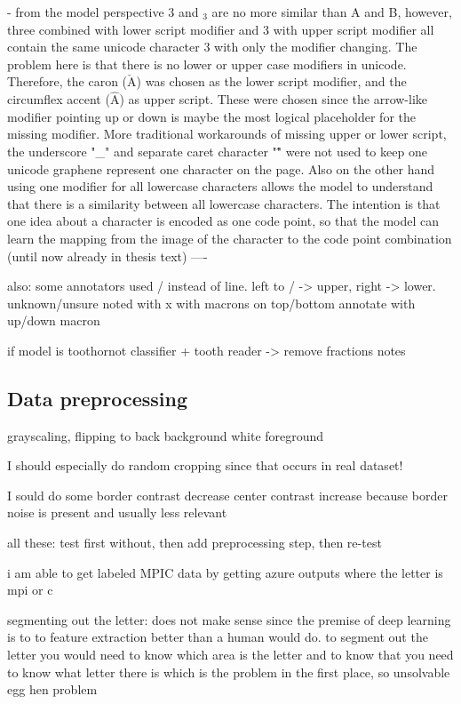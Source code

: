 \documentclass{article}
\begin{document}
- from the model perspective 3 and $_3$ are no more similar than A and B, however, 
three combined with lower script modifier and 3 with upper script modifier 
all contain the same unicode character 3 with only the modifier changing. The 
problem here is that there is no lower or upper case modifiers in unicode. Therefore,
the caron ($\check{\mathrm{A}}$) was chosen as the lower script modifier, and the circumflex accent ($\hat{\mathrm{A}}$)
as upper script. These were chosen since the arrow-like modifier pointing up or down
is maybe the most logical placeholder for the missing modifier. More traditional 
workarounds of missing upper or lower script, the underscore "\_" and separate 
caret character "\^ " were not used to keep one unicode graphene represent one character 
on the page. Also on the other hand using one modifier for all lowercase characters allows 
the model to understand that there is a similarity between all lowercase characters.
The intention is that one idea about a character is encoded as one code point, so that 
the model can learn the mapping from the image of the character to the code point 
combination
(until now already in thesis text)
----

also: some annotators used / instead of line. left to / -> upper, right -> lower.
unknown/unsure noted with x with macrons on top/bottom
annotate with up/down macron

if model is toothornot classifier + tooth reader -> remove fractions notes

\subsection{Data preprocessing}

grayscaling, flipping to back background white foreground

I should especially do random cropping since that occurs in real dataset!

I sould do some border contrast decrease center contrast increase because border noise is present and usually less relevant 

all these: test first without, then add preprocessing step, then re-test

i am able to get labeled MPIC data by getting azure outputs where the letter is mpi or c

segmenting out the letter: does not make sense since the premise of deep learning is 
to to feature extraction better than a human would do. to segment out the letter you would 
need to know which area is the letter and to know that you need to know what letter there 
is which is the problem in the first place, so unsolvable egg hen problem
\end{document}
